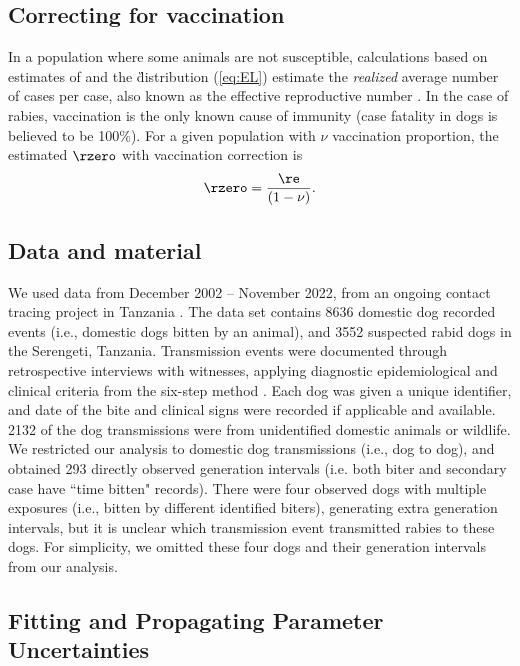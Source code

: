\FloatBarrier

\subsection*{Correcting for vaccination}

In a population where some animals are not susceptible, calculations based on estimates of \littler and the \G distribution (\ref{eq:EL}) estimate the \emph{realized} average number of cases per case, also known as the effective reproductive number \re.
In the case of rabies, vaccination is the only known cause of immunity (case fatality in dogs is believed to be 100\%).
For a given population with $\nu$ vaccination proportion, the estimated $\rzero$ with vaccination correction is
\begin{equation}
\rzero = \frac{\re}{(1 - \nu)}.
\label{eq:RE}
\end{equation}

\subsection*{Data and material}


We used data from December 2002 -- November 2022, from an ongoing contact tracing project in Tanzania \citep{hampson2008rabies, hampson2009transmission}.
The data set contains 8636 domestic dog recorded events (i.e., domestic dogs bitten by an animal), and 3552 suspected rabid dogs in the Serengeti, Tanzania.
Transmission events were documented through retrospective interviews with witnesses, applying diagnostic epidemiological and clinical criteria from the six-step method \citep{tepsumethanon2005six}.
Each dog was given a unique identifier, and date of the bite and clinical signs were recorded if applicable and available.
2132 of the dog transmissions were from unidentified domestic animals or wildlife.
We restricted our analysis to domestic dog transmissions (i.e., dog to dog), and obtained 293 directly observed generation intervals (i.e. both biter and secondary case have ``time bitten" records).
There were four observed dogs with multiple exposures (i.e., bitten by different identified biters), generating extra generation intervals, but it is unclear which transmission event transmitted rabies to these dogs.
For simplicity, we omitted these four dogs and their generation intervals from our analysis.

\subsection*{Fitting and Propagating Parameter Uncertainties}


